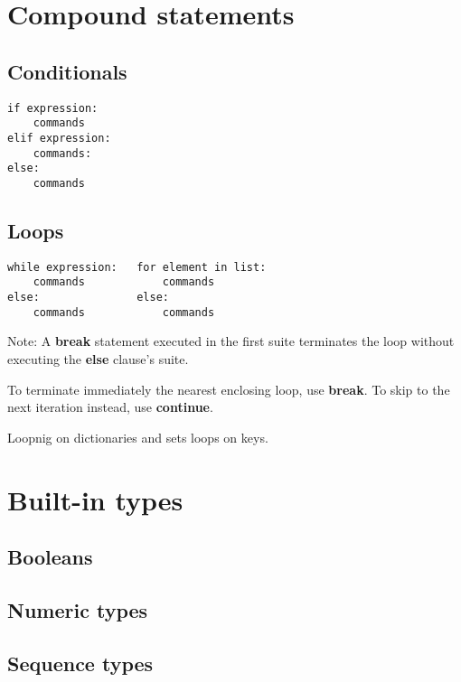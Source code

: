 \documentclass[a4paper, twoside, 8pt]{extarticle}
\newcommand{\python}[1] {\textbf{\color{blue}#1}}
\begin{document}
\renewcommand{\footrulewidth}{0.4pt}

\begin{multicols*}{3}
\raggedright
\section{Compound statements}
\subsection{Conditionals}
\begin{verbatim}
if expression:
    commands
elif expression:
    commands:
else:
    commands
\end{verbatim}

\subsection{Loops}
\begin{verbatim}
while expression:   for element in list:
    commands            commands
else:               else:
    commands            commands
\end{verbatim}

Note: A \python{break} statement executed in the first suite terminates 
the loop without executing the \python{else} clause's suite.

To terminate immediately the nearest enclosing loop, use \python{break}.
To skip to the next iteration instead, use \python{continue}.

Loopnig on dictionaries and sets loops on keys.

\section{Built-in types}

\subsection{Booleans}

\subsection{Numeric types}


\subsection{Sequence types}


\end{multicols*}
\end{document}
